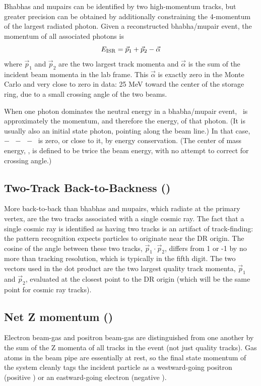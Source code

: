 Bhabhas and mupairs can be identified by two high-momentum tracks, but
greater precision can be obtained by additionally constraining the
4-momentum of the largest radiated photon.  Given a reconstructed
bhabha/mupair event, the momentum of all associated photons is
\begin{equation}
  E_{\mbox{\scriptsize ISR}} = \vec{p}_1 + \vec{p}_2 - \vec{\alpha}
\end{equation}
where $\vec{p}_1$ and $\vec{p}_2$ are the two largest track momenta
and $\vec{\alpha}$ is the sum of the incident beam momenta in the lab
frame.  This $\vec{\alpha}$ is exactly zero in the Monte Carlo and
very close to zero in data: 25 MeV toward the center of the storage
ring, due to a small crossing angle of the two beams.

When one photon dominates the neutral energy in a bhabha/mupair event,
\eisr\ is approximately the momentum, and therefore the energy, of
that photon.  (It is usually also an initial state photon, pointing
along the beam line.)  In that case, \ecom\ $-$ \pone\ $-$ \ptwo\ $-$
\eisr\ is zero, or close to it, by energy conservation.  (The center
of mass energy, \ecom, is defined to be twice the beam energy, with no
attempt to correct for crossing angle.)

\subsection{Two-Track Back-to-Backness (\pdotp)}

More back-to-back than bhabhas and mupairs, which radiate at the
primary vertex, are the two tracks associated with a single cosmic
ray.  The fact that a single cosmic ray is identified as having two
tracks is an artifact of track-finding: the pattern recognition
expects particles to originate near the DR origin.  The cosine of the
angle between these two tracks, $\vec{p}_1\cdot\vec{p}_2$, differs
from 1 or -1 by no more than tracking resolution, which is typically
in the fifth digit.  The two vectors used in the dot product are the
two largest quality track momenta, $\vec{p}_1$ and $\vec{p}_2$,
evaluated at the closest point to the DR origin (which will be the
same point for cosmic ray tracks).

\subsection{Net Z momentum (\pz)}

Electron beam-gas and positron beam-gas are distinguished from one
another by the sum of the Z momenta of all tracks in the event (not
just quality tracks).  Gas atoms in the beam pipe are essentially at
rest, so the final state momentum of the system cleanly tags the
incident particle as a westward-going positron (positive \pz) or an
eastward-going electron (negative \pz).

